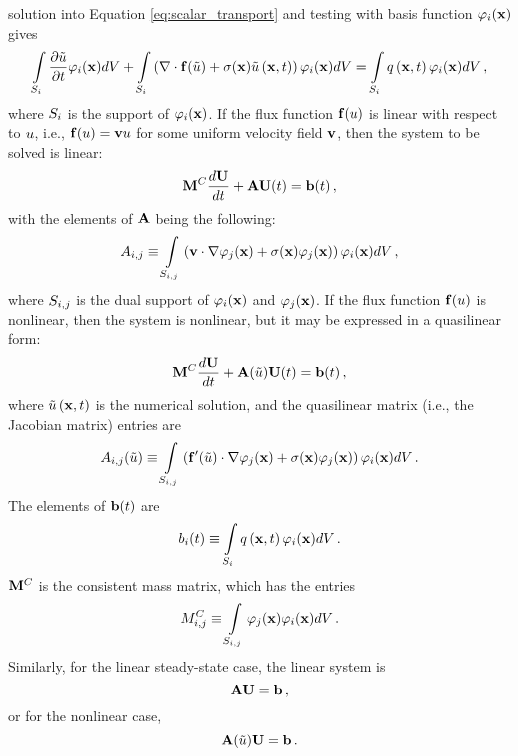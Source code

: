 solution into Equation \eqref{eq:scalar_transport} and testing with basis
function $\testfunction_i(\x)$ gives
\begin{equation}
   \intSi\ppt{\approximatescalarsolution}\testfunction_i(\x) d\volume
      + \intSi\left(\divergence\consfluxscalar[\approximatescalarsolution]
      + \reactioncoef(\x)\approximatescalarsolution\xt\right)
      \testfunction_i(\x) d\volume
      = \intSi \scalarsource\xt \testfunction_i(\x) d\volume \eqc
\end{equation}
where $\support_i$ is the support of $\testfunction_i(\x)$. If the flux
function $\consfluxscalar$ is linear with respect to $\scalarsolution$, i.e.,
$\consfluxscalar = \velocity\scalarsolution$ for some uniform velocity field
$\velocity$, then the system to be solved is linear:
\begin{equation}\label{eq:semidiscrete}
  \consistentmassmatrix\ddt{\solutionvector}+\ssmatrix\solutionvector(t)
  = \ssrhs(\timevalue) \eqc
\end{equation}
with the elements of $\ssmatrix$ being the following:
\begin{equation}\label{eq:Aij}
  \ssmatrixletter\ij \equiv \intSij\left(
  \velocity\cdot\nabla\testfunction_j(\x) +
  \reactioncoef(\x)\testfunction_j(\x)\right)\testfunction_i(\x) d\volume \eqc
\end{equation}
where $\support\ij$ is the dual support of $\testfunction_i(\x)$ and
$\testfunction_j(\x)$.
If the flux function $\consfluxscalar$ is nonlinear, then the system is
nonlinear, but it may be expressed in a quasilinear form:
\begin{equation}\label{eq:semi_quasilinear}
   \consistentmassmatrix\ddt{\solutionvector}
   + \ssmatrix(\approximatescalarsolution)\solutionvector(\timevalue)
   = \ssrhs(\timevalue) \eqc
\end{equation}
where $\approximatescalarsolution\xt$ is the numerical solution, and the
quasilinear matrix (i.e., the Jacobian matrix) entries are
\begin{equation}\label{eq:Aij_nonlinear}
  \ssmatrixletter\ij(\approximatescalarsolution) \equiv \intSij\left(
  \mathbf{\consfluxletter}'(\approximatescalarsolution)\cdot\nabla
  \testfunction_j(\x) +
  \reactioncoef(\x)\testfunction_j(\x)\right)
  \testfunction_i(\x) d\volume \eqp
\end{equation}
The elements of $\ssrhs(\timevalue)$ are
\begin{equation}
  \ssrhsletter_i(\timevalue) \equiv \intSi \scalarsource\xt\testfunction_i(\x)
  d\volume \eqp
\end{equation}
$\consistentmassmatrix$ is the consistent mass matrix, which has the entries
\begin{equation}\label{eq:massmatrix}
  \massmatrixletter^C\ij \equiv \intSij
  \testfunction_j(\x)\testfunction_i(\x) d\volume \eqp
\end{equation}
Similarly, for the linear steady-state case, the linear system is
\begin{equation}
  \ssmatrix\solutionvector = \ssrhs \eqc
\end{equation}
or for the nonlinear case,
\begin{equation}
  \ssmatrix(\approximatescalarsolution)\solutionvector = \ssrhs \eqp
\end{equation}
